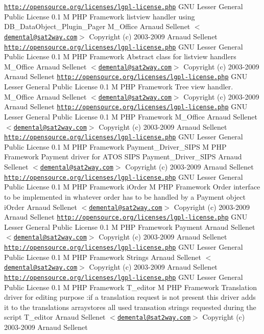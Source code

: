 \begin{Desc}
\href{http://opensource.org/licenses/lgpl-license.php}{\tt http://opensource.org/licenses/lgpl-license.php} GNU Lesser General Public License  0.1  M PHP Framework  listview handler using DB\_\-DataObject\_\-Plugin\_\-Pager   M\_\-Office  Arnaud Sellenet $<$\href{mailto:demental@sat2way.com}{\tt demental@sat2way.com}$>$  Copyright (c) 2003-2009 Arnaud Sellenet  \href{http://opensource.org/licenses/lgpl-license.php}{\tt http://opensource.org/licenses/lgpl-license.php} GNU Lesser General Public License  0.1  M PHP Framework  Abstract class for listview handlers   M\_\-Office  Arnaud Sellenet $<$\href{mailto:demental@sat2way.com}{\tt demental@sat2way.com}$>$  Copyright (c) 2003-2009 Arnaud Sellenet  \href{http://opensource.org/licenses/lgpl-license.php}{\tt http://opensource.org/licenses/lgpl-license.php} GNU Lesser General Public License  0.1  M PHP Framework  Tree view handler.   M\_\-Office  Arnaud Sellenet $<$\href{mailto:demental@sat2way.com}{\tt demental@sat2way.com}$>$  Copyright (c) 2003-2009 Arnaud Sellenet  \href{http://opensource.org/licenses/lgpl-license.php}{\tt http://opensource.org/licenses/lgpl-license.php} GNU Lesser General Public License  0.1  M PHP Framework   M\_\-Office  Arnaud Sellenet $<$\href{mailto:demental@sat2way.com}{\tt demental@sat2way.com}$>$  Copyright (c) 2003-2009 Arnaud Sellenet  \href{http://opensource.org/licenses/lgpl-license.php}{\tt http://opensource.org/licenses/lgpl-license.php} GNU Lesser General Public License  0.1  M PHP Framework   Payment\_\-Driver\_\-SIPS  M PHP Framework  Payment driver for ATOS SIPS   Payment\_\-Driver\_\-SIPS  Arnaud Sellenet $<$\href{mailto:demental@sat2way.com}{\tt demental@sat2way.com}$>$  Copyright (c) 2003-2009 Arnaud Sellenet  \href{http://opensource.org/licenses/lgpl-license.php}{\tt http://opensource.org/licenses/lgpl-license.php} GNU Lesser General Public License  0.1  M PHP Framework   iOrder  M PHP Framework  Order interface to be implemented in whatever order has to be handled by a Payment object   iOrder  Arnaud Sellenet $<$\href{mailto:demental@sat2way.com}{\tt demental@sat2way.com}$>$  Copyright (c) 2003-2009 Arnaud Sellenet  \href{http://opensource.org/licenses/lgpl-license.php}{\tt http://opensource.org/licenses/lgpl-license.php} GNU Lesser General Public License  0.1  M PHP Framework   Payment  Arnaud Sellenet $<$\href{mailto:demental@sat2way.com}{\tt demental@sat2way.com}$>$  Copyright (c) 2003-2009 Arnaud Sellenet  \href{http://opensource.org/licenses/lgpl-license.php}{\tt http://opensource.org/licenses/lgpl-license.php} GNU Lesser General Public License  0.1  M PHP Framework   Strings  Arnaud Sellenet $<$\href{mailto:demental@sat2way.com}{\tt demental@sat2way.com}$>$  Copyright (c) 2003-2009 Arnaud Sellenet  \href{http://opensource.org/licenses/lgpl-license.php}{\tt http://opensource.org/licenses/lgpl-license.php} GNU Lesser General Public License  0.1  M PHP Framework   T\_\-editor  M PHP Framework  Translation driver for editing purpose :if a translation request is not present this driver adds it to the translations arraystores all used transation strings requested during the script   T\_\-editor  Arnaud Sellenet $<$\href{mailto:demental@sat2way.com}{\tt demental@sat2way.com}$>$  Copyright (c) 2003-2009 Arnaud Sellenet  
\end{Desc}
